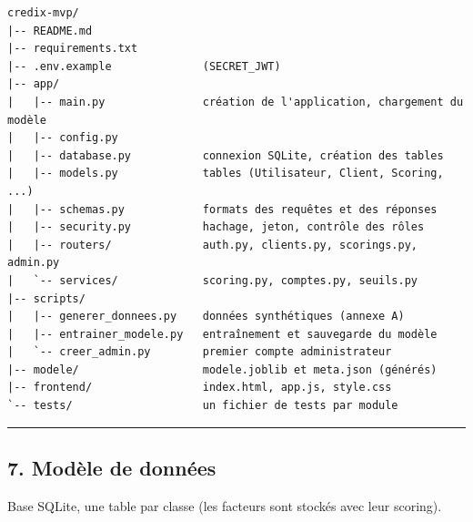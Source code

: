 \documentclass[
  french,
  11pt,
  a4paper,
]{article}
\begin{document}
\begin{Verbatim}[breaklines=true,breakanywhere=true,fontsize=\small,frame=leftline,framerule=1.6pt,rulecolor=\color{credixblue},framesep=3mm,xleftmargin=2mm,xrightmargin=1mm]
credix-mvp/
|-- README.md
|-- requirements.txt
|-- .env.example              (SECRET_JWT)
|-- app/
|   |-- main.py               création de l'application, chargement du modèle
|   |-- config.py
|   |-- database.py           connexion SQLite, création des tables
|   |-- models.py             tables (Utilisateur, Client, Scoring, ...)
|   |-- schemas.py            formats des requêtes et des réponses
|   |-- security.py           hachage, jeton, contrôle des rôles
|   |-- routers/              auth.py, clients.py, scorings.py, admin.py
|   `-- services/             scoring.py, comptes.py, seuils.py
|-- scripts/
|   |-- generer_donnees.py    données synthétiques (annexe A)
|   |-- entrainer_modele.py   entraînement et sauvegarde du modèle
|   `-- creer_admin.py        premier compte administrateur
|-- modele/                   modele.joblib et meta.json (générés)
|-- frontend/                 index.html, app.js, style.css
`-- tests/                    un fichier de tests par module
\end{Verbatim}

\begin{center}\rule{0.5\linewidth}{0.5pt}\end{center}

\subsection{7. Modèle de données}\label{7-moduxe8le-de-donnuxe9es}

Base SQLite, une table par classe (les facteurs sont stockés avec leur
scoring).
\end{document}
